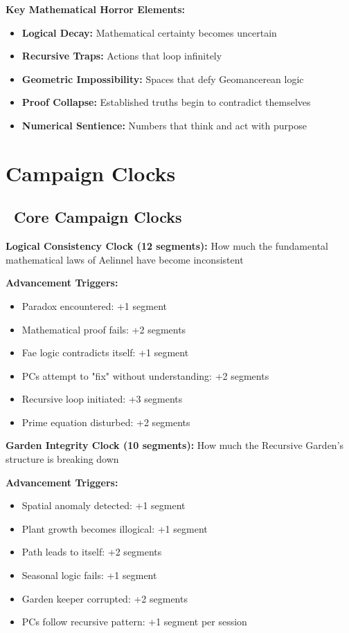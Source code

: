 \documentclass[11pt]{article}
\begin{document}
\textbf{Key Mathematical Horror Elements:}
\begin{itemize}
    \item \textbf{Logical Decay:} Mathematical certainty becomes uncertain
    \item \textbf{Recursive Traps:} Actions that loop infinitely
    \item \textbf{Geometric Impossibility:} Spaces that defy Geomancerean logic
    \item \textbf{Proof Collapse:} Established truths begin to contradict themselves
    \item \textbf{Numerical Sentience:} Numbers that think and act with purpose
\end{itemize}

\section{Campaign Clocks}

\subsection*{\faClock\ Core Campaign Clocks}

\textbf{Logical Consistency Clock (12 segments):}
How much the fundamental mathematical laws of Aelinnel have become inconsistent

\textbf{Advancement Triggers:}
\begin{itemize}
    \item Paradox encountered: +1 segment
    \item Mathematical proof fails: +2 segments
    \item Fae logic contradicts itself: +1 segment
    \item PCs attempt to "fix" without understanding: +2 segments
    \item Recursive loop initiated: +3 segments
    \item Prime equation disturbed: +2 segments
\end{itemize}

\textbf{Garden Integrity Clock (10 segments):}
How much the Recursive Garden's structure is breaking down

\textbf{Advancement Triggers:}
\begin{itemize}
    \item Spatial anomaly detected: +1 segment
    \item Plant growth becomes illogical: +1 segment
    \item Path leads to itself: +2 segments
    \item Seasonal logic fails: +1 segment
    \item Garden keeper corrupted: +2 segments
    \item PCs follow recursive pattern: +1 segment per session
\end{itemize}
\end{document}
